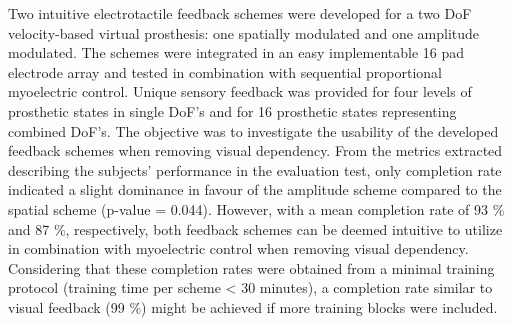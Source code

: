 Two intuitive electrotactile feedback schemes were developed for a two DoF velocity-based virtual prosthesis: one spatially modulated and one amplitude modulated. The schemes were integrated in an easy implementable 16 pad electrode array and tested in combination with sequential proportional myoelectric control. Unique sensory feedback was provided for four levels of prosthetic states in single DoF's and for 16 prosthetic states representing combined DoF's. The objective was to investigate the usability of the developed feedback schemes when removing visual dependency.
From the metrics extracted describing the subjects' performance in the evaluation test, only completion rate indicated a slight  dominance in favour of the amplitude scheme compared to the spatial scheme (p-value = 0.044). However, with a mean completion rate of 93 \% and 87 \%, respectively, both feedback schemes can be deemed intuitive to utilize in combination with myoelectric control when removing visual dependency. Considering that these completion rates were obtained from a minimal training protocol (training time per scheme < 30 minutes), a completion rate similar to visual feedback (99 \%) might be achieved if more training blocks were included. 


